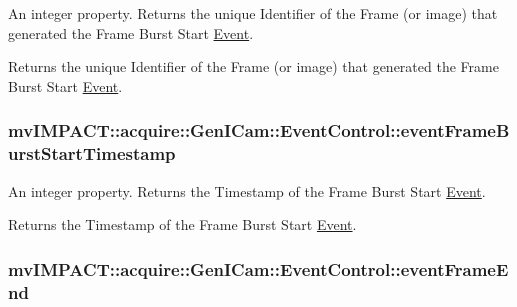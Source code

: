 An integer property. Returns the unique Identifier of the Frame (or image) that generated the Frame Burst Start \hyperlink{classmv_i_m_p_a_c_t_1_1acquire_1_1_event}{Event}. 

Returns the unique Identifier of the Frame (or image) that generated the Frame Burst Start \hyperlink{classmv_i_m_p_a_c_t_1_1acquire_1_1_event}{Event}. \hypertarget{classmv_i_m_p_a_c_t_1_1acquire_1_1_gen_i_cam_1_1_event_control_a204ef5131e625d290ba04a3cc8fdd5db}{
\subsubsection[{event\+Frame\+Burst\+Start\+Timestamp}]{ mv\+I\+M\+P\+A\+C\+T\+::acquire\+::\+Gen\+I\+Cam\+::\+Event\+Control\+::event\+Frame\+Burst\+Start\+Timestamp}}\label{classmv_i_m_p_a_c_t_1_1acquire_1_1_gen_i_cam_1_1_event_control_a204ef5131e625d290ba04a3cc8fdd5db}


An integer property. Returns the Timestamp of the Frame Burst Start \hyperlink{classmv_i_m_p_a_c_t_1_1acquire_1_1_event}{Event}. 

Returns the Timestamp of the Frame Burst Start \hyperlink{classmv_i_m_p_a_c_t_1_1acquire_1_1_event}{Event}. \hypertarget{classmv_i_m_p_a_c_t_1_1acquire_1_1_gen_i_cam_1_1_event_control_a2ff9ab9e23707c5da27429850cd808a8}{
\subsubsection[{event\+Frame\+End}]{ mv\+I\+M\+P\+A\+C\+T\+::acquire\+::\+Gen\+I\+Cam\+::\+Event\+Control\+::event\+Frame\+End}}\label{classmv_i_m_p_a_c_t_1_1acquire_1_1_gen_i_cam_1_1_event_control_a2ff9ab9e23707c5da27429850cd808a8}


